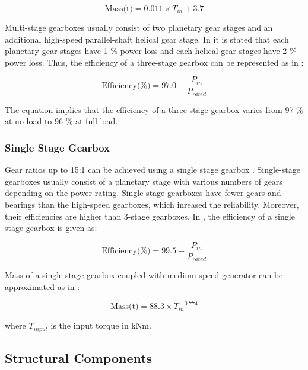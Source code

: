 \documentclass{article}\usepackage{graphicx, color}
\begin{document}
\begin{equation}
\text{Mass(t)} = 0.011 \times T_{in} + 3.7
\label{3G_gearbox}
\end{equation}

Multi-stage gearboxes usually consist of two planetary gear stages and an additional high-speed parallel-shaft helical gear stage. In \cite{Hau2005a} it is stated that each planetary gear stages have 1 \% power loss and each helical gear stages have 2 \% power loss. Thus, the efficiency of a three-stage gearbox can be represented as in \cite{Zhang2011a}:

\begin{equation}
  \text{Efficiency(\%)} = 97.0 - \dfrac{P_{in}}{P_{rated}}
\end{equation}

The equation implies that the efficiency of a three-stage gearbox varies from 97 \% at no load to 96 \% at full load.


\subsubsection{Single Stage Gearbox}

Gear ratios up to 15:1 can be achieved using a single stage gearbox \cite{Cotrell2002}. Single-stage gearboxes usually consist of a planetary stage with various numbers of gears depending on the power rating. Single stage gearboxes have fewer gears and bearings than the high-speed gearboxes, which inreased the reliability. Moreover, their efficiencies are higher than 3-stage gearboxes. In \cite{Matveev2011}, the efficiency of a single stage gearbox is given as:

\begin{equation}
  \text{Efficiency(\%)} = 99.5 - \dfrac{P_{in}}{P_{rated}}
\end{equation}

Mass of a single-stage gearbox coupled with medium-speed generator can be approximated as in \cite{Fingersh2006}:

\begin{equation}
	\text{Mass(t)} = 88.3 \times {T_{in}}^{0.774}
\end{equation}

where $T_{input}$ is the input torque in kNm.


\subsection{Structural Components}
\end{document}
